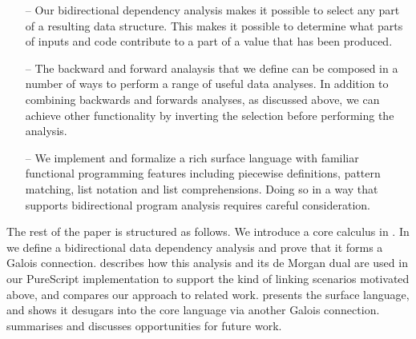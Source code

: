 \begin{itemize}
\item[--] Our bidirectional dependency analysis makes it possible to select any part of a resulting data structure. This makes it possible to determine what parts of inputs and code contribute to a part of a value that has been produced.
\item[--] The backward and forward analaysis that we define can be composed in a number of ways to perform a range of useful data analyses. In addition to combining backwards and forwards analyses, as discussed above, we can achieve other functionality by inverting the selection before performing the analysis.
\item[--] We implement and formalize a rich surface language with familiar functional programming features including piecewise definitions, pattern matching, list notation and list comprehensions. Doing so in a way that supports bidirectional program analysis requires careful consideration.
\end{itemize}

\noindent The rest of the paper is structured as follows. We introduce a core calculus in . In  we define a bidirectional data dependency analysis and prove that it forms a Galois connection.  describes how this analysis and its de Morgan dual are used in our PureScript implementation to support the kind of linking scenarios motivated above, and compares our approach to related work.  presents the surface language, and shows it desugars into the core language via another Galois connection.  summarises and discusses opportunities for future work.


